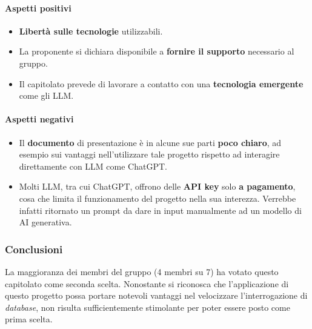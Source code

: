 \documentclass[italian,12pt]{article} %
\begin{document}
\paragraph{Aspetti positivi}
\begin{itemize}
	\item \textbf{Libertà sulle tecnologie} utilizzabili.
	\item La proponente si dichiara disponibile a \textbf{fornire il supporto} necessario al gruppo.
	\item Il capitolato prevede di lavorare a contatto con una \textbf{tecnologia emergente} come gli LLM.
\end{itemize}

\paragraph{Aspetti negativi}
\begin{itemize}
	\item Il \textbf{documento} di presentazione è in alcune sue parti \textbf{poco chiaro}, ad esempio sui vantaggi nell'utilizzare tale progetto rispetto ad interagire
	      direttamente con LLM come ChatGPT.
	\item Molti LLM, tra cui ChatGPT, offrono delle \textbf{API key} solo \textbf{a pagamento}, cosa che limita il funzionamento del progetto nella
	      sua interezza. Verrebbe infatti ritornato un prompt da dare in input manualmente ad un modello di AI generativa.

\end{itemize}

\subsubsection{Conclusioni}
La maggioranza dei membri del gruppo (4 membri su 7) ha votato questo capitolato come seconda scelta. Nonostante si riconosca
che l'applicazione di questo progetto possa portare notevoli vantaggi nel velocizzare l'interrogazione di \textit{database},
non risulta sufficientemente stimolante per poter essere posto come prima scelta.
\end{document}

